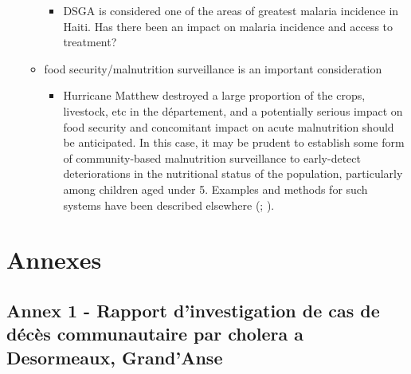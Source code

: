 \documentclass[]{tufte-handout}
\providecommand{\tightlist}{%
  \setlength{\itemsep}{0pt}\setlength{\parskip}{0pt}}
\begin{document}
\begin{itemize}
\begin{itemize}
    \begin{itemize}
    \tightlist
    \item
      DSGA is considered one of the areas of greatest malaria incidence
      in Haiti. Has there been an impact on malaria incidence and access
      to treatment?
    \end{itemize}
  \item
    food security/malnutrition surveillance is an important
    consideration

    \begin{itemize}
    \tightlist
    \item
      Hurricane Matthew destroyed a large proportion of the crops,
      livestock, etc in the département, and a potentially serious
      impact on food security and concomitant impact on acute
      malnutrition should be anticipated. In this case, it may be
      prudent to establish some form of community-based malnutrition
      surveillance to early-detect deteriorations in the nutritional
      status of the population, particularly among children aged under
      5. Examples and methods for such systems have been described
      elsewhere (\citet{Caleo2012}; \citet{Polonsky2013a}).
    \end{itemize}
  \end{itemize}
\end{itemize}

\clearpage

\hypertarget{annexes}{\section{Annexes}\label{annexes}}

\subsection{Annex 1 - Rapport d'investigation de cas de décès
communautaire par cholera a Desormeaux,
Grand'Anse}\label{annex-1---rapport-dinvestigation-de-cas-de-deces-communautaire-par-cholera-a-desormeaux-grandanse}
\end{document}
